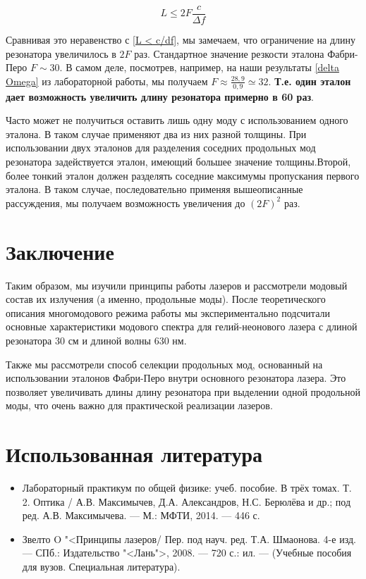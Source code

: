 \documentclass[12pt]{kiarticle}
\begin{document}
\begin{equation}\label{}
L \leq 2F \dfrac{c}{\Delta f}
\end{equation}

Сравнивая это неравенство с \eqref{L < c/df}, мы замечаем, что ограничение на длину резонатора увеличилось в $ 2F $ раз. Стандартное значение резкости эталона Фабри-Перо $ F \sim 30 $. В самом деле, посмотрев, например, на наши результаты \eqref{delta Omega} из лабораторной работы, мы получаем $ F \approx \frac{28,9}{0,9} \simeq 32 $. \textbf{Т.е. один эталон дает возможность увеличить длину резонатора примерно в 60 раз}. 

Часто может не получиться оставить лишь одну моду с использованием одного эталона. В таком случае применяют два из них разной толщины. При использовании двух эталонов для разделения соседних продольных мод резонатора задействуется эталон, имеющий большее значение толщины.Второй, более тонкий эталон должен разделять соседние максимумы пропускания первого эталона. В таком случае, последовательно применяя вышеописанные рассуждения, мы получаем возможность увеличения до $ (2F)^2 $ раз. 

\section{Заключение}

Таким образом, мы изучили принципы работы лазеров и рассмотрели модовый состав их излучения (а именно, продольные моды). После теоретического описания многомодового режима работы мы экспериментально подсчитали основные характеристики модового спектра для гелий-неонового лазера с длиной резонатора 30 см и длиной волны 630 нм. 

Также мы рассмотрели способ селекции продольных мод, основанный на использовании эталонов Фабри-Перо внутри основного резонатора лазера. Это позволяет увеличивать длины длину резонатора при выделении одной продольной моды, что очень важно для практической реализации лазеров. 

\section*{Использованная литература}

\begin{itemize}
	
	\item Лабораторный практикум по общей физике: учеб. пособие. В трёх томах. Т. 2. Оптика / А.В. Максимычев, Д.А. Александров, Н.С. Берюлёва и др.; под ред. А.В. Максимычева. --- М.: МФТИ, 2014. --- 446 с.
	
	\item Звелто O "<Принципы лазеров/ Пер. под науч. ред. Т.А. Шмаонова. 4-е изд. --- СПб.: Издательство "<Лань">, 2008. --- 720 с.: ил. --- (Учебные пособия для вузов. Специальная литература).
	
\end{itemize}
\end{document}
